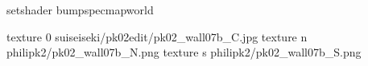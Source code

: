 setshader bumpspecmapworld

texture 0 suiseiseki/pk02edit/pk02_wall07b_C.jpg
texture n philipk2/pk02_wall07b_N.png
texture s philipk2/pk02_wall07b_S.png

